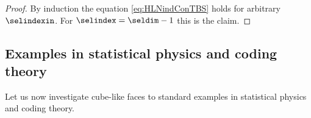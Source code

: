 \begin{proof}

    By induction the equation \eqref{eq:HLNindConTBS} holds for arbitrary $\selindexin$.
    For $\selindex=\seldim-1$ this is the claim.
\end{proof}

\subsection{Examples in statistical physics and coding theory}

Let us now investigate cube-like faces to standard examples in statistical physics and coding theory.



